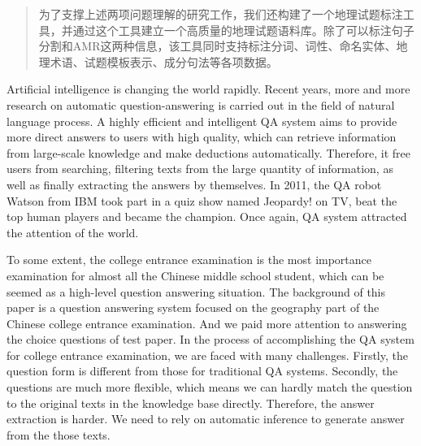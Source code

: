 \documentclass[master, winfont]{njuthesis}
\begin{document}
\begin{abstract}
为了支撑上述两项问题理解的研究工作，我们还构建了一个地理试题标注工具，并通过这个工具建立一个高质量的地理试题语料库。除了可以标注句子分割和AMR这两种信息，该工具同时支持标注分词、词性、命名实体、地理术语、试题模板表示、成分句法等各项数据。

\end{abstract}

\begin{englishabstract}
Artificial intelligence is changing the world rapidly. Recent years, more and more research on automatic question-answering is carried out in the field of natural language process. A highly efficient and intelligent QA system aims to provide more direct answers to users with high quality, which can retrieve information from large-scale knowledge and make deductions automatically. Therefore, it free users from searching, filtering texts from the large quantity of information, as well as finally extracting the answers by themselves. In 2011, the QA robot Watson from IBM took part in a quiz show named Jeopardy! on TV, beat the top human players and became the champion. Once again, QA system attracted the attention of the world.

To some extent, the college entrance examination is the most importance examination for almost all the Chinese middle school student, which can be seemed as a high-level question answering situation. The background of this paper is a question answering system focused on the geography part of the Chinese college entrance examination. And we paid more attention to answering the choice questions of test paper.  In the process of accomplishing the QA system for college entrance examination, we are faced with many challenges. Firstly, the question form is different from those for traditional QA systems. Secondly, the questions are much more flexible, which means we can hardly match the question to the original texts in the knowledge base directly. Therefore, the answer extraction is harder. We need to rely on automatic inference to generate answer from the those texts.


\end{englishabstract}
\end{document}
